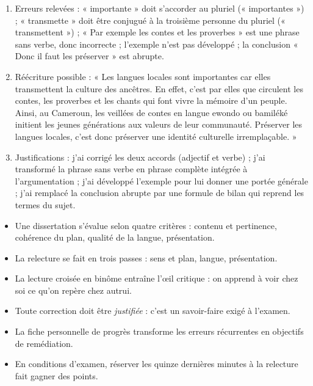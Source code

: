 \documentclass[11pt]{article}
\begin{document}
\begin{corrige}
\begin{enumerate}
\item Erreurs relevées : « importante » doit s'accorder au pluriel (« importantes ») ; « transmette » doit être conjugué à la troisième personne du pluriel (« transmettent ») ; « Par exemple les contes et les proverbes » est une phrase sans verbe, donc incorrecte ; l'exemple n'est pas développé ; la conclusion « Donc il faut les préserver » est abrupte.
\item Réécriture possible : « Les langues locales sont importantes car elles transmettent la culture des ancêtres. En effet, c'est par elles que circulent les contes, les proverbes et les chants qui font vivre la mémoire d'un peuple. Ainsi, au Cameroun, les veillées de contes en langue ewondo ou bamiléké initient les jeunes générations aux valeurs de leur communauté. Préserver les langues locales, c'est donc préserver une identité culturelle irremplaçable. »
\item Justifications : j'ai corrigé les deux accords (adjectif et verbe) ; j'ai transformé la phrase sans verbe en phrase complète intégrée à l'argumentation ; j'ai développé l'exemple pour lui donner une portée générale ; j'ai remplacé la conclusion abrupte par une formule de bilan qui reprend les termes du sujet.
\end{enumerate}
\end{corrige}

\begin{aretenir}
\begin{itemize}
\item Une dissertation s'évalue selon quatre critères : contenu et pertinence, cohérence du plan, qualité de la langue, présentation.
\item La relecture se fait en trois passes : sens et plan, langue, présentation.
\item La lecture croisée en binôme entraîne l'œil critique : on apprend à voir chez soi ce qu'on repère chez autrui.
\item Toute correction doit être \emph{justifiée} : c'est un savoir-faire exigé à l'examen.
\item La fiche personnelle de progrès transforme les erreurs récurrentes en objectifs de remédiation.
\item En conditions d'examen, réserver les quinze dernières minutes à la relecture fait gagner des points.
\end{itemize}
\end{aretenir}
\end{document}
